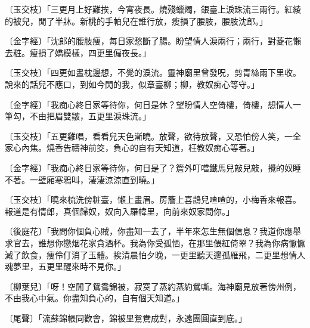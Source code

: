 〔玉交枝〕「三更月上好難挨，今宵夜長。燒殘蠟燭，銀臺上淚珠流三兩行。紅綾的被兒，閒了半牀。新桃的手帕兒在誰行放，瘦損了腰肢，腰肢沈郎。」

〔金字經〕「沈郎的腰肢瘦，每日家愁斷了腸。盼望情人淚兩行；兩行，對菱花懶去粧。瘦損了嬌模樣，四更里偏夜長。」

〔玉交枝〕「四更如晝枕邊想，不覺的淚流。靈神廟里曾發呪，剪青絲兩下里收。說來的話兒不應口，到如今閃的我，似章臺柳；柳，教奴痴心等守。」

〔金字經〕「我痴心終日家等待你，何日是休？望盼情人空倚樓，倚樓，想情人一筆勾，不由把眉雙皺，五更里淚珠流。」

〔玉交枝〕「五更雞唱，看看兒天色漸曉。放聲，欲待放聲，又恐怕傍人笑，一全家心內焦。燒香告禱神前筊，負心的自有天知道，枉教奴痴心等著。」

〔金字經〕「我痴心終日家等待你，何日是了？簷外叮噹鐵馬兒敲兒敲，攪的奴睡不著。一壁廂寒鴉叫，淒淒涼涼直到曉。」

〔玉交枝〕「曉來梳洗傍粧臺，懶上畫眉。房簷上喜鵲兒喳喳的，小梅香來報喜。報道是有情郎，真個歸奴，奴向入羅幃里，向前來奴家問你。」

〔後庭花〕「我問你個負心賊，你盡知一去了，半年來怎生無個信息？我道你應舉求官去，誰想你戀烟花家貪酒杯。我為你受孤恓，在那里偎紅倚翠？我為你病懨懨減了飲食，瘦伶仃消了玉體。挨清晨怕夕晚，一更里聽天邊孤雁飛，二更里想情人魂夢里，五更里醒來時不見你。」

〔柳葉兒〕「呀！空閒了鴛鴦錦被，寂寞了蒸約蒸約鶯嘶。海神廟見放著傍州例，不由我心中氣。你盡知負心的，自有個天知道。」

〔尾聲〕「流蘇錦帳同歡會，錦被里鴛鴦成對，永遠團圓直到底。」

